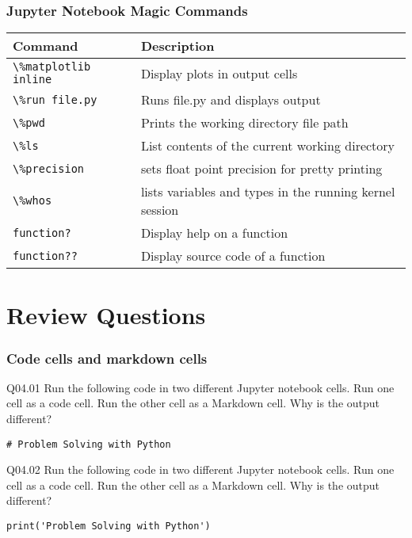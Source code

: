 \documentclass{book}
\newenvironment{problems}{}{}  %
\newcommand{\passthrough}[1]{#1}
\begin{document}
    
        \hypertarget{jupyter-notebook-magic-commands}{%
\subsubsection{Jupyter Notebook Magic
Commands}\label{jupyter-notebook-magic-commands}}

\begin{longtable}[]{@{}ll@{}}
\toprule
Command & Description\tabularnewline
\midrule
\endhead
\passthrough{\lstinline!\%matplotlib inline!} & Display plots in output
cells\tabularnewline
\passthrough{\lstinline!\%run file.py!} & Runs file.py and displays
output\tabularnewline
\passthrough{\lstinline!\%pwd!} & Prints the working directory file
path\tabularnewline
\passthrough{\lstinline!\%ls!} & List contents of the current working
directory\tabularnewline
\passthrough{\lstinline!\%precision!} & sets float point precision for
pretty printing\tabularnewline
\passthrough{\lstinline!\%whos!} & lists variables and types in the
running kernel session\tabularnewline
\passthrough{\lstinline!function?!} & Display help on a
function\tabularnewline
\passthrough{\lstinline!function??!} & Display source code of a
function\tabularnewline
\bottomrule
\end{longtable}
    




    
        \hypertarget{review-questions}{%
\section{Review Questions}\label{review-questions}}
    




    
        \begin{problems}
        \hypertarget{code-cells-and-markdown-cells}{%
\subsubsection{Code cells and markdown
cells}\label{code-cells-and-markdown-cells}}

Q04.01 Run the following code in two different Jupyter notebook cells.
Run one cell as a code cell. Run the other cell as a Markdown cell. Why
is the output different?

\begin{lstlisting}
# Problem Solving with Python
\end{lstlisting}

Q04.02 Run the following code in two different Jupyter notebook cells.
Run one cell as a code cell. Run the other cell as a Markdown cell. Why
is the output different?

\begin{lstlisting}
print('Problem Solving with Python')
\end{lstlisting}
        \end{problems}
\end{document}
